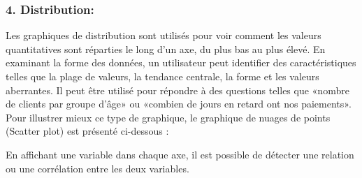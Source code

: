 \documentclass[french, a4paper, 12pt]{report}
\begin{document}
\subsubsection{4. Distribution: }
Les graphiques de distribution sont utilisés pour voir comment les valeurs quantitatives sont réparties le long d'un axe, du plus bas au plus élevé. En examinant la forme des données, un utilisateur peut identifier des caractéristiques telles que la plage de valeurs, la tendance centrale, la forme et les valeurs aberrantes. Il peut être utilisé pour répondre à des questions telles que «nombre de clients par groupe d'âge» ou «combien de jours en retard ont nos paiements».
Pour illustrer mieux ce type de graphique, le graphique de nuages de points (Scatter plot) est présenté ci-dessous :
\pagebreak

En affichant une variable dans chaque axe, il est possible de détecter une relation ou une corrélation entre les deux variables.
\end{document}
